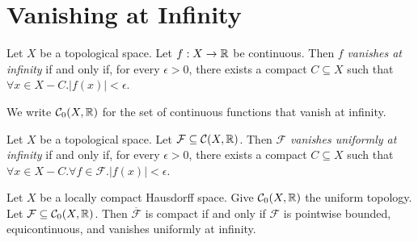 \section{Vanishing at Infinity}

\begin{definition}
    Let $X$ be a topological space. Let $f : X \rightarrow \mathbb{R}$ be continuous. Then $f$ \emph{vanishes at infinity}
    if and only if, for every $\epsilon > 0$, there exists a compact $C \subseteq X$ such that $\forall x \in X - C. |f(x)| < \epsilon$.

    We write $\mathcal{C}_0(X, \mathbb{R})$ for the set of continuous functions that vanish at infinity.
\end{definition}

\begin{definition}
    Let $X$ be a topological space. Let $\mathcal{F} \subseteq \mathcal{C}(X,\mathbb{R})$. Then $\mathcal{F}$ \emph{vanishes uniformly at infinity}
    if and only if, for every $\epsilon > 0$, there exists a compact $C \subseteq X$ such that $\forall x \in X - C. \forall f \in \mathcal{F}.
    |f(x)| < \epsilon$.
\end{definition}

\begin{theorem}
    Let $X$ be a locally compact Hausdorff space. Give $\mathcal{C}_0(X, \mathbb{R})$ the uniform topology. Let $\mathcal{F} \subseteq
    \mathcal{C}_0(X, \mathbb{R})$. Then $\overline{\mathcal{F}}$ is compact if and only if $\mathcal{F}$ is pointwise bounded,
    equicontinuous, and vanishes uniformly at infinity.
\end{theorem}

